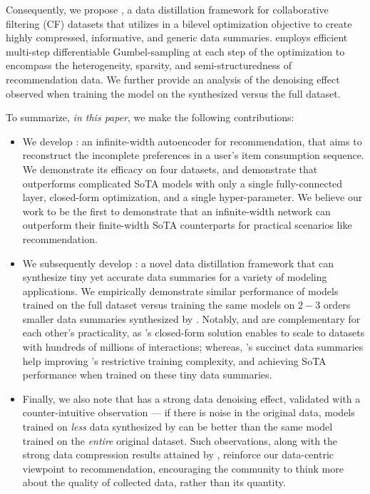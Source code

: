 \documentclass{article}
\begin{document}
Consequently, we propose \sampler, a data distillation framework for collaborative filtering (CF) datasets that utilizes \model in a bilevel optimization objective to create highly compressed, informative, and generic data summaries. \sampler employs efficient multi-step differentiable Gumbel-sampling \cite{gumbel} at each step of the optimization to encompass the heterogeneity, sparsity, and semi-structuredness of recommendation data.
We further provide an analysis of the denoising effect observed when training the model on the synthesized versus the full dataset.

To summarize, \emph{in this paper}, we make the following contributions:
\begin{itemize}[leftmargin=.3in]
    \item We develop \model: an infinite-width autoencoder for recommendation, that aims to reconstruct the incomplete preferences in a user's item consumption sequence. We demonstrate its efficacy on four datasets, and demonstrate that \model outperforms complicated SoTA models with only a single fully-connected layer, closed-form optimization, and a single hyper-parameter. We believe our work to be the first to demonstrate that an infinite-width network can outperform their finite-width SoTA counterparts for practical scenarios like recommendation.
    
    \item We subsequently develop \sampler: a novel data distillation framework that can synthesize tiny yet accurate data summaries for a variety of modeling applications. We empirically demonstrate similar performance of models trained on the full dataset versus training the same models on $2-3$ orders smaller data summaries synthesized by \sampler.
Notably, \sampler and \model are complementary for each other's practicality, as \model's closed-form solution enables \sampler to scale to datasets with hundreds of millions of interactions; whereas, \sampler's succinct data summaries help improving \model's restrictive training complexity, and achieving SoTA performance when trained on these tiny data summaries.
    
    \item Finally, we also note that \sampler has a strong data denoising effect, validated with a counter-intuitive observation --- if there is noise in the original data, models trained on \emph{less} data synthesized by \sampler can be better than the same model trained on the \emph{entire} original dataset. 
Such observations, along with the strong data compression results attained by \sampler, reinforce our data-centric viewpoint to recommendation, encouraging the community to think more about the quality of collected data, rather than its quantity. \end{itemize}
\end{document}
